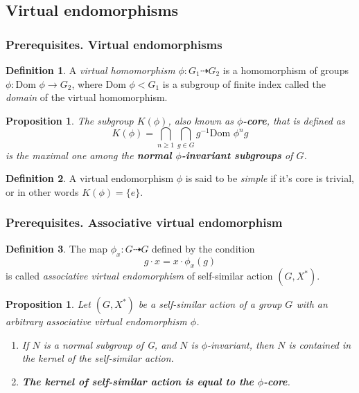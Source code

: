 \documentclass[notheorems,handout,san serif,hyperref={unicode}]{beamer} %
\newcommand{\Dom}{\text{Dom }}
\newtheorem{proposition}[theorem]{Proposition}
\theoremstyle{definition}
\newtheorem{definition}{Definition}[section]
\begin{document}
\subsection{Virtual endomorphisms}

\begin{frame}
	\frametitle{Prerequisites. Virtual endomorphisms}
	
	\begin{definition}
		A \textit{virtual homomorphism} $\phi: G_1 \dashrightarrow G_2$ is a homomorphism of groups $\phi: \Dom \phi \rightarrow G_2$, where $\Dom \phi < G_1$ is a subgroup of finite index called the \textit{domain} of the virtual homomorphism. 
	\end{definition}
		
	\begin{proposition}
		The subgroup $K(\phi)$, also known as \textbf{$\phi$-core}, that is defined as  
		$$
		K(\phi) = \bigcap_{n\ge1}\bigcap_{g \in G} g^{-1} \Dom \phi^n g
		$$
		is the maximal one among the \textbf{normal $\phi$-invariant subgroups} of $G$.
	\end{proposition}
	
	
	\begin{definition}
		A virtual endomorphism $\phi$ is said to be \textit{simple} if it's core is trivial, or in other words $K(\phi) = \{e\}$.
		
	\end{definition}
\end{frame}


\begin{frame}
	
	\frametitle{Prerequisites. Associative virtual endomorphism}
	
	\begin{definition}
		
		The map $\phi_x : G \dashrightarrow G$ defined by the condition
		$$
		g \cdot x = x \cdot \phi_x (g)
		$$ 
		is called \textit{associative virtual endomorphism} of self-similar action $(G, X^*)$.
	\end{definition}
	
	\vskip 1cm
	
	\begin{proposition}
		Let $(G, X^*)$ be a self-similar action of a group $G$ with an arbitrary associative virtual endomorphism $\phi$. 
		
		\begin{enumerate}
			\item If $N$ is a normal subgroup of G, and $N$ is $\phi$-invariant, then $N$ is contained in the kernel of the self-similar action.
			
			\item \textbf{The kernel of self-similar action is equal to the $\phi$-core}.
		\end{enumerate} 
		
	\end{proposition}
\end{frame}
\end{document}
